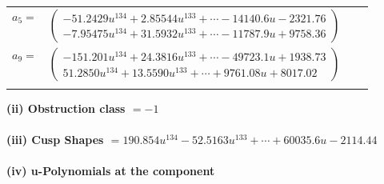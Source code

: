\documentclass[1p]{elsarticle_modified}
\theoremstyle{definition}
\begin{document}
\begin{tabular}{m{7pt} m{180pt} m{7pt} m{180pt} }
\flushright $a_{5}=$&$\begin{pmatrix}-51.2429 u^{134}+2.85544 u^{133}+\cdots-14140.6 u-2321.76\\-7.95475 u^{134}+31.5932 u^{133}+\cdots-11787.9 u+9758.36\end{pmatrix}$ \\
\flushright $a_{9}=$&$\begin{pmatrix}-151.201 u^{134}+24.3816 u^{133}+\cdots-49723.1 u+1938.73\\51.2850 u^{134}+13.5590 u^{133}+\cdots+9761.08 u+8017.02\end{pmatrix}$\\&\end{tabular}
\flushleft \textbf{(ii) Obstruction class $= -1$}\\~\\
\flushleft \textbf{(iii) Cusp Shapes $= 190.854 u^{134}-52.5163 u^{133}+\cdots+60035.6 u-2114.44$}\\~\\
\newpage\renewcommand{\arraystretch}{1}
\flushleft \textbf{(iv) u-Polynomials at the component}\newline \\
\end{document}
